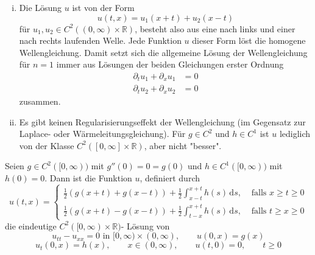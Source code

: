 \begin{bemerkung}
	\begin{enumerate}[(i)]
		\item Die Lösung $u$ ist von der Form
		\[
			u(t,x) = u_1(x+t) + u_2(x-t)
		\]
		für $u_1, u_2 \in C^2((0,\infty) \times \mathbb{R})$, besteht also aus eine nach links und einer nach rechts laufenden Welle. Jede Funktion $u$ dieser Form löst
		die homogene Wellengleichung. Damit setzt sich die allgemeine Lösung der Wellengleichung für $n=1$ immer aus Lösungen der beiden Gleichungen erster Ordnung 
		\begin{align*}
			\partial_t u_1 + \partial_x u_1 &= 0 \\
			\partial_t u_2 + \partial_x u_2 &= 0 
		\end{align*}
		zusammen.
		\item Es gibt keinen Regularisierungseffekt der Wellengleichung (im Gegensatz zur Laplace- oder Wärmeleitungsgleichung). Für $g \in C^2$ und $h \in C^1$ ist 
		$u$ lediglich von der Klasse $C^2([0, \infty] \times \mathbb{R})$, aber nicht "besser".
	\end{enumerate}
\end{bemerkung}
\begin{korollar}
	Seien $g \in C^2([0, \infty))$ mit $g''(0)=0 = g(0)$ und $h \in C^1([0,\infty))$ mit $h(0)=0$. Dann ist die Funktion $u$, definiert durch 
	\[
		u(t,x) = \begin{cases}
			\frac{1}{2}(g(x+t)+g(x-t)) + \frac{1}{2} \int_{x-t}^{x+t}h(s) \,\mathrm{d}s, &\text{ falls } x \geq t \geq 0\\
			\frac{1}{2}(g(x+t)-g(x-t)) + \frac{1}{2} \int_{t-x}^{x+t}h(s) \,\mathrm{d}s, &\text{ falls } t \geq x \geq 0
		\end{cases}
	\]
	die eindeutige $C^2([0,\infty) \times \mathbb{R})$- Lösung von 
	\[
		u_{tt}- u_{xx} = 0 \text{ in } [0, \infty) \times (0,\infty), \qquad u(0,x) = g(x)
	\]
	\[
		u_t(0,x) = h(x), \qquad x \in (0, \infty), \qquad u(t,0) = 0, \qquad t \geq 0
	\]
\end{korollar}
